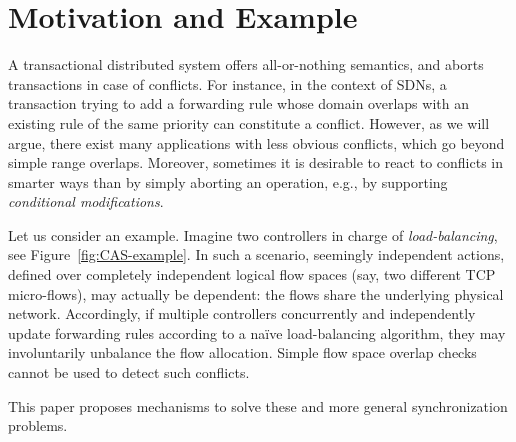 \documentclass[conference]{sigcomm-alternate}
\begin{document}
\section{Motivation and Example}\label{sec:motivation}

A transactional distributed system offers all-or-nothing semantics, 
and aborts transactions in case of conflicts. 
For instance, in the context of SDNs, a transaction trying to add a forwarding rule whose
domain overlaps with an existing rule of the same priority
can constitute a conflict. 
However, as we will argue, 
there exist many applications with less obvious conflicts, which go 
beyond simple range overlaps. 
Moreover, sometimes it is desirable to react to conflicts in smarter ways than
by simply aborting an operation, e.g., by supporting \emph{conditional modifications}.

Let us consider an example.
Imagine two controllers
in charge
of \emph{load-balancing}, see Figure~\ref{fig:CAS-example}.
In such a scenario, seemingly independent actions, defined over
completely independent logical flow spaces (say, two different
TCP micro-flows),
may actually be dependent: the flows share the underlying physical network.
Accordingly, if multiple controllers concurrently and independently
update forwarding rules according to a na\"ive load-balancing algorithm,
they may involuntarily
unbalance the flow allocation.
Simple flow space overlap checks cannot be used to detect
such conflicts.


This paper proposes mechanisms to solve these and more general 
synchronization problems.
\end{document}
